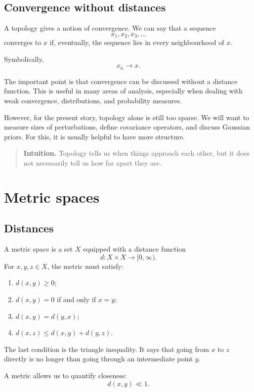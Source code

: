 \documentclass[11pt,a4paper]{book}
\newenvironment{intuition}
  {\begin{quote}\textbf{Intuition.}}
  {\end{quote}}
\begin{document}
\subsection{Convergence without distances}

A topology gives a notion of convergence. We can say that a sequence
\[
    x_1,x_2,x_3,\ldots
\]
converges to $x$ if, eventually, the sequence lies in every neighbourhood of
$x$.

Symbolically,
\[
    x_n \to x.
\]

The important point is that convergence can be discussed without a distance
function. This is useful in many areas of analysis, especially when dealing with
weak convergence, distributions, and probability measures.

However, for the present story, topology alone is still too sparse. We will
want to measure sizes of perturbations, define covariance operators, and discuss
Gaussian priors. For this, it is usually helpful to have more structure.

\begin{intuition}
Topology tells us when things approach each other, but it does not necessarily
tell us how far apart they are.
\end{intuition}

\section{Metric spaces}

\subsection{Distances}

A metric space is a set $X$ equipped with a distance function
\[
    d:X\times X\to [0,\infty).
\]
For $x,y,z\in X$, the metric must satisfy:
\begin{enumerate}[label=\arabic*.]
    \item $d(x,y)\geq 0$;
    \item $d(x,y)=0$ if and only if $x=y$;
    \item $d(x,y)=d(y,x)$;
    \item $d(x,z)\leq d(x,y)+d(y,z)$.
\end{enumerate}

The last condition is the triangle inequality. It says that going from $x$ to
$z$ directly is no longer than going through an intermediate point $y$.

A metric allows us to quantify closeness:
\[
    d(x,y) \ll 1.
\]
\end{document}
